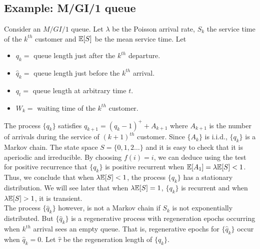 \documentclass[all-lectures.tex]{subfiles}
\begin{document}

\setcounter{section}{4}
\setcounter{subsection}{0}

\section*{}
\subsection{Example: M/GI/1 queue}
Consider an $M/GI/1$ queue. Let $\lambda$  be the Poisson arrival rate, $S_k$ the service time of the $k^{th}$ customer and $\mathbb{E}[S]$ be the mean service time. Let 
\begin{itemize}
\item $q_k = $ queue length just after the $k^{th}$ departure. 
\item $\hat{q}_k = $ queue length just before the $k^{th}$ arrival. 
\item $q_t =$ queue length at arbitrary time $t$.
\item $W_k = $ waiting time of the $k^{th}$ customer.
\end{itemize}
The process $\{q_k\}$ satisfies $q_{k+1} = (q_k -1)^+ + A_{k+1}$ where $A_{k+1}$ is the number of arrivals during the service of $(k+1)^{th}$ customer. Since $\{A_k\}$ is i.i.d., $\{q_k\}$ is a Markov chain. The state space $S = \{0,1,2\dots\}$ and it is easy to check that it is aperiodic and irreducible. By choosing $f(i) = i$, we can deduce using the test for positive recurrence that $\{q_k\}$ is positive recurrent when $\mathbb{E}[A_1] = \lambda \mathbb{E}[S] < 1$. Thus, we conclude that when $\lambda \mathbb{E}[S] < 1$, the process $\{q_k\}$ has a stationary distribution. We will  see later that when $\lambda\mathbb{E}[S] = 1$, $\{q_k\}$ is recurrent and when $\lambda \mathbb{E}[S] > 1$, it is transient. \\
\indent  The process $\{\hat{q}_k\}$ however, is not a Markov chain if $S_k$ is not exponentially distributed. But $\{\hat{q}_k\}$ is a regenerative process with regeneration epochs occurring when $k^{th}$ arrival sees an empty queue. That is, regenerative epochs for $\{\hat{q}_k\}$ occur when $ \hat{q}_k = 0$. Let $\hat{\tau}$ be the regeneration length of $\{\hat{q}_k\}$. \\
\end{document}
